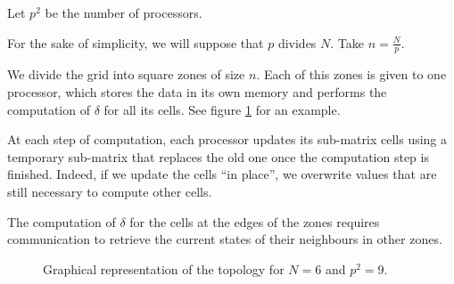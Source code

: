 
\begin{question}

Let $p^2$ be the number of processors.

For the sake of simplicity, we will suppose that $p$ divides $N$. Take $n = \frac{N}{p}$.

We divide the grid into square zones of size $n$. Each of this zones is given to one processor, which stores the data in its own memory and performs the computation of $\delta$ for all its cells. See figure \ref{q2:draw} for an example.

At each step of computation, each processor updates its sub-matrix cells using a temporary sub-matrix that replaces the old one once the computation step is finished. Indeed,  if we update the cells ``in place'', we overwrite values that are still necessary to compute other cells.

The computation of $\delta$ for the cells at the edges of the zones requires communication to retrieve the current states of their neighbours in other zones.

\begin{figure}
\caption{Graphical representation of the topology for $N=6$ and $p^2=9$.}
\label{q2:draw}
\begin{center}
\end{center}
\end{figure}


\end{question}


